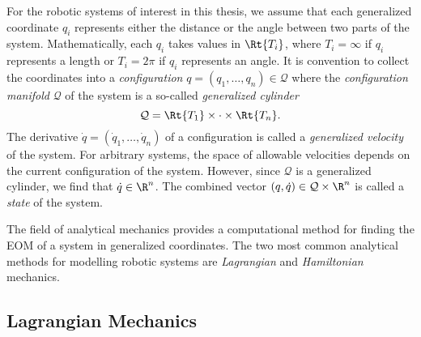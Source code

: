 For the robotic systems of interest in this thesis, we assume that
each generalized coordinate \(q_i\) represents either the distance or the angle
between two parts of the system.
Mathematically, each \(q_i\) takes values in \(\Rt{T_i}\), where
\(T_i = \infty\) if \(q_i\) represents a length or \(T_i = 2\pi\) if \(q_i\)
represents an angle.
It is convention to collect the coordinates into a \textit{configuration} 
\(q = (q_1,\ldots,q_n) \in \mathcal{Q}\) 
where the \textit{configuration manifold} \(\mathcal{Q}\) of the system is a
so-called \textit{generalized cylinder}
\[
    \mathcal{Q} = \Rt{T_1} \times \cdot \times \Rt{T_n}
    .
\] 
The derivative \(\dot{q} = (\dot{q}_1,\ldots,\dot{q}_n)\) of a configuration
is called a \textit{generalized velocity} of the system. For arbitrary systems,
the space of allowable velocities depends on the current configuration of the
system.  However, since \(\mathcal{Q}\) is a generalized cylinder, we find that 
\(\dot{q} \in \R^n\).
The combined vector \((q,\dot{q}) \in \mathcal{Q}\times\R^n\) is called a 
\textit{state} of the system.

The field of analytical mechanics provides a computational method for finding
the EOM of a system in generalized coordinates. The two most common analytical
methods for modelling robotic systems are \textit{Lagrangian} and
\textit{Hamiltonian} mechanics.

\subsection{Lagrangian Mechanics}\label{sec:lagrangian-mechanics}

